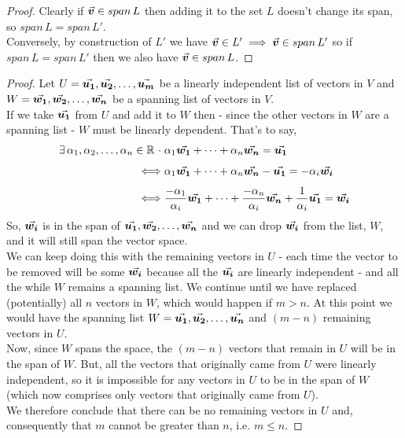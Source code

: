 \documentclass[MathsNotesBase.tex]{subfiles}
\begin{document}
{	\medskip
	\begin{proof}
		Clearly if ${ \vec{\bm{v}} \in span\,L }$ then adding it to the set $L$ doesn't change its span, so ${ span\,L = span\,L' }$.\\
		Conversely, by construction of $L'$ we have ${ \vec{\bm{v}} \in L' \implies \vec{\bm{v}} \in span\,L' }$ so if ${ span\,L = span\,L' }$ then we also have ${ \vec{\bm{v}} \in span\,L }$.
	\end{proof}
	
	\bigskip
	\begin{proof}
	Let $U = \vec{\bm{u_1}}, \vec{\bm{u_2}}, \dots, \vec{\bm{u_m}}$ be a linearly independent list of vectors in $V$ and $W = \vec{\bm{w_1}}, \vec{\bm{w_2}}, \dots, \vec{\bm{w_n}}$ be a spanning list of vectors in $V$.\\
	If we take $\vec{\bm{u_1}}$ from $U$ and add it to $W$ then - since the other vectors in $W$ are a spanning list - $W$ must be linearly dependent. That's to say,
	\begin{align*}
	\exists\,\alpha_1,\alpha_2,\dots,\alpha_n \in \mathbb{R}^{} \;\cdot\; &\alpha_1\vec{\bm{w_1}} + \dots + \alpha_n\vec{\bm{w_n}} = \vec{\bm{u_1}} \\[4pt]
	\iff &\alpha_1\vec{\bm{w_1}} + \dots + \alpha_n\vec{\bm{w_n}} - \vec{\bm{u_1}} = -\alpha_i\vec{\bm{w_i}}\\[4pt]
	\iff &\frac{-\alpha_1}{\alpha_i}\vec{\bm{w_1}} + \dots + \frac{-\alpha_n}{\alpha_i}\vec{\bm{w_n}} + \frac{1}{\alpha_i}\vec{\bm{u_1}} = \vec{\bm{w_i}}
	\end{align*}
	So, $\vec{\bm{w_i}}$ is in the span of $\vec{\bm{u_1}}, \vec{\bm{w_2}}, \dots, \vec{\bm{w_n}}$ and we can drop $\vec{\bm{w_i}}$ from the list, $W$, and it will still span the vector space.\\
	We can keep doing this with the remaining vectors in $U$ - each time the vector to be removed will be some $\vec{\bm{w_i}}$ because all the $\vec{\bm{u_i}}$ are linearly independent - and all the while $W$ remains a spanning list. We continue until we have replaced (potentially) all $n$ vectors in $W$, which would happen if $m > n$. At this point we would have the spanning list $W = \vec{\bm{u_1}}, \vec{\bm{u_2}}, \dots, \vec{\bm{u_n}}$ and $(m - n)$ remaining vectors in $U$.\\
	Now, since $W$ spans the space, the $(m - n)$ vectors that remain in $U$ will be in the span of $W$. But, all the vectors that originally came from $U$ were linearly independent, so it is impossible for any vectors in $U$ to be in the span of $W$ (which now comprises only vectors that originally came from $U$).\\
	We therefore conclude that there can be no remaining vectors in $U$ and, consequently that $m$ cannot be greater than $n$, i.e. $m \leq n$.
	\end{proof}

}
\end{document}
